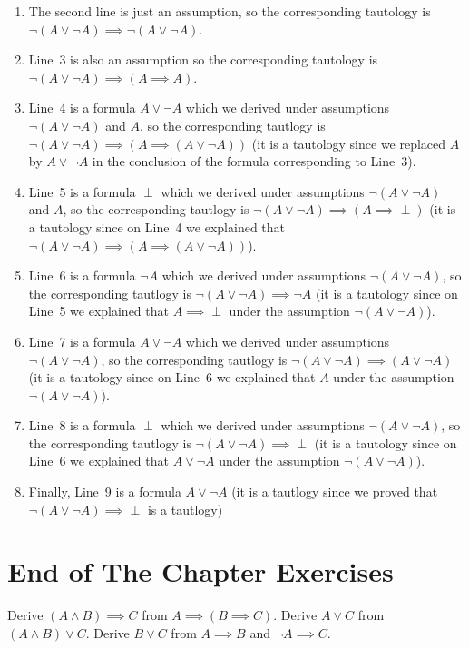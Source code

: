 \begin{enumerate}
  \item The second line is just an assumption, so the corresponding tautology is
    $\lnot (A \lor \lnot A) \implies \lnot (A \lor \lnot A)$.
  \item Line~3 is also an assumption so the corresponding tautology is
    $\lnot (A \lor \lnot A) \implies (A \implies A)$.
  \item Line~4 is a formula $A \lor \lnot A$ which we derived under assumptions
    $\lnot (A \lor \lnot A)$ and $A$, so the corresponding tautlogy is
    $\lnot (A \lor \lnot A) \implies (A \implies (A \lor \lnot A))$ (it is a
    tautology since we replaced $A$ by $A \lor \lnot A$ in the conclusion of
    the formula corresponding to Line~3).
  \item Line~5 is a formula $\perp$ which we derived under assumptions
    $\lnot (A \lor \lnot A)$ and $A$, so the corresponding tautlogy is
    $\lnot (A \lor \lnot A) \implies (A \implies \perp)$ (it is a
    tautology since on Line~4 we explained that $\lnot (A \lor \lnot A)
    \implies (A \implies (A \lor \lnot A))$).
  \item Line~6 is a formula $\lnot A$ which we derived under assumptions
    $\lnot (A \lor \lnot A)$, so the corresponding tautlogy is
    $\lnot (A \lor \lnot A) \implies \lnot A$ (it is a
    tautology since on Line~5 we explained that $A \implies \perp$ under the
    assumption $\lnot (A \lor \lnot A)$).
  \item Line~7 is a formula $A \lor \lnot A$ which we derived under assumptions
    $\lnot (A \lor \lnot A)$, so the corresponding tautlogy is
    $\lnot (A \lor \lnot A) \implies (A \lor \lnot A)$ (it is a
    tautology since on Line~6 we explained that $A$ under the
    assumption $\lnot (A \lor \lnot A)$).
  \item Line~8 is a formula $\perp$ which we derived under assumptions
    $\lnot (A \lor \lnot A)$, so the corresponding tautlogy is
    $\lnot (A \lor \lnot A) \implies \perp$ (it is a
    tautology since on Line~6 we explained that $A \lor \lnot A$ under the
    assumption $\lnot (A \lor \lnot A)$).
  \item Finally, Line~9 is a formula $A \lor \lnot A$ (it is a tautlogy since
    we proved that $\lnot (A \lor \lnot A) \implies \perp$ is a tautlogy)
\end{enumerate}


\section*{End of The Chapter Exercises}
\begin{exercises}
  \exerciseitem Derive $(A \land B) \implies C$ from
    $A \implies (B \implies C)$.
  \exerciseitem Derive $A \lor C$ from
    $(A \land B) \lor C$.
  \exerciseitem Derive $B \lor C$ from
    $A \implies B$ and $\lnot A \implies C$.
\end{exercises}
